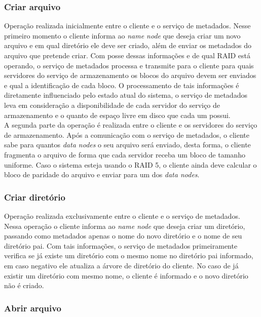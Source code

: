 \subsubsection{Criar arquivo}

Operação realizada inicialmente entre o cliente e o serviço de metadados. Nesse primeiro momento o cliente informa ao \textit{name node} que deseja criar um novo arquivo e em qual diretório ele deve ser criado, além de enviar os metadados do arquivo que pretende criar. Com posse dessas informações e de qual RAID está operando, o serviço de metadados processa e transmite para o cliente para quais servidores do serviço de armazenamento os blocos do arquivo devem ser enviados e qual a identificação de cada bloco. O processamento de tais informações é diretamente influenciado pelo estado atual do sistema, o serviço de metadados leva em consideração a disponibilidade de cada servidor do serviço de armazenamento e o quanto de espaço livre em disco que cada um possui.
\\

A segunda parte da operação é realizada entre o cliente e os servidores do serviço de armazenamento. Após a comunicação com o serviço de metadados, o cliente sabe para quantos \textit{data nodes} o seu arquivo será enviado, desta forma, o cliente fragmenta o arquivo de forma que cada servidor receba um bloco de tamanho uniforme. Caso o sistema esteja usando o RAID 5, o cliente ainda deve calcular o bloco de paridade do arquivo e enviar para um dos \textit{data nodes}.
\\

\subsubsection{Criar diretório}

Operação realizada exclusivamente entre o cliente e o serviço de metadados. Nessa operação o cliente informa ao \textit{name node} que deseja criar um diretório, passando como metadados apenas o nome do novo diretório e o nome de seu diretório pai. Com tais informações, o serviço de metadados primeiramente verifica se já existe um diretório com o mesmo nome no diretório pai informado, em caso negativo ele atualiza a árvore de diretório do cliente. No caso de já existir um diretório com mesmo nome, o cliente é informado e o novo diretório não é criado.
\\

\subsubsection{Abrir arquivo}

